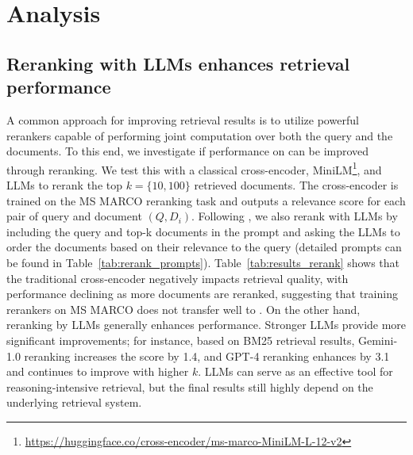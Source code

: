 % 
\section{Analysis}

\subsection{Reranking with LLMs enhances retrieval performance}
\label{sec:rerank}
A common approach for improving retrieval results is to utilize powerful rerankers capable of performing joint computation over both the query and the documents.
To this end, we investigate if performance on \ours{} can be improved through reranking.
We test this with a classical cross-encoder, MiniLM\footnote{\url{https://huggingface.co/cross-encoder/ms-marco-MiniLM-L-12-v2}}, and LLMs to rerank the top $k=\{10, 100\}$ retrieved documents.
The cross-encoder is trained on the MS MARCO reranking task \citep{bajaj2016ms} and outputs a relevance score for each pair of query and document $(Q, D_i)$.
Following \citet{sun2023chatgpt}, we also rerank with LLMs by including the query and top-k documents in the prompt and asking the LLMs to order the documents based on their relevance to the query (detailed prompts can be found in Table~\ref{tab:rerank_prompts}).
Table~\ref{tab:results_rerank} shows that the traditional cross-encoder negatively impacts retrieval quality, with performance declining as more documents are reranked, suggesting that training rerankers on MS MARCO does not transfer well to \ours.
On the other hand, reranking by LLMs generally enhances performance. 
Stronger LLMs provide more significant improvements; for instance, based on BM25 retrieval results, Gemini-1.0 reranking increases the score by 1.4, and GPT-4 reranking enhances by 3.1 and continues to improve with higher $k$. 
LLMs can serve as an effective tool for reasoning-intensive retrieval, but the final results still highly depend on the underlying retrieval system.


